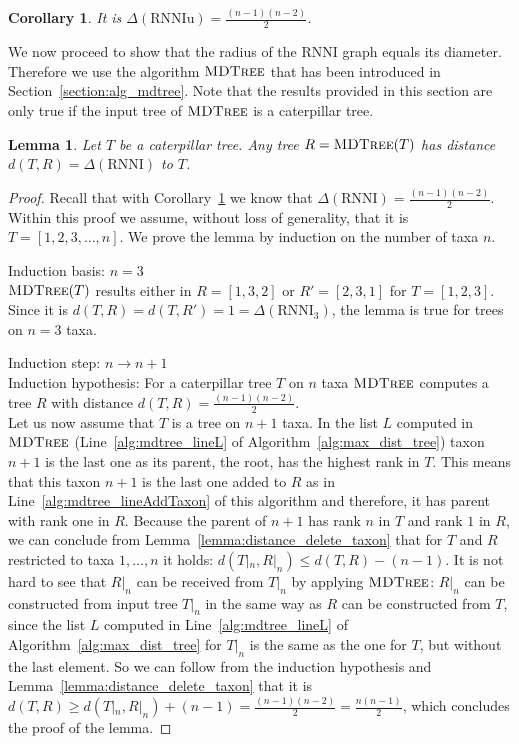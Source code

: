 \documentclass{amsart}
\newcommand{\rnni}{\mathrm{RNNI}}
\newcommand{\rnniu}{\mathrm{RNNIu}}
\newcommand{\mdtree}{\textsc{MDTree}}
\newtheorem{lemma}[definition]{Lemma}
\newtheorem{corollary}[definition]{Corollary}
\begin{document}
\begin{corollary}
It is $\Delta(\rnniu) = \frac{(n-1)(n-2)}{2}$.
\label{corollary:diameter}
\end{corollary}

We now proceed to show that the radius of the $\rnni$ graph equals its diameter.
Therefore we use the algorithm $\mdtree$ that has been introduced in Section~\ref{section:alg_mdtree}.
Note that the results provided in this section are only true if the input tree of $\mdtree$ is a caterpillar tree.

\begin{lemma}
Let $T$ be a caterpillar tree.
Any tree $R = \mdtree(T)$ has distance $d(T,R) = \Delta(\rnni)$ to $T$.
\label{lemma:max_dist_caterpillar}
\end{lemma}

\begin{proof}
Recall that with Corollary~\ref{corollary:diameter} we know that $\Delta(\rnni) = \frac{(n-1)(n-2)}{2}$.
Within this proof we assume, without loss of generality, that it is $T = [1,2,3,\ldots,n]$.
We prove the lemma by induction on the number of taxa $n$.

Induction basis: $n = 3$\\
$\mdtree(T)$ results either in $R =[1,3,2]$ or $R'= [2,3,1]$ for $T = [1,2,3]$.
Since it is $d(T,R) = d(T,R') = 1 = \Delta(\rnni_3)$, the lemma is true for trees on $n=3$ taxa.

Induction step: $n \to n+1$\\
Induction hypothesis: For a caterpillar tree $T$ on $n$ taxa $\mdtree$ computes a tree $R$ with distance $d(T,R) = \frac{(n-1)(n-2)}{2}$.\\
Let us now assume that $T$ is a tree on $n+1$ taxa.
In the list $L$ computed in $\mdtree$ (Line~\ref{alg:mdtree_lineL} of Algorithm~\ref{alg:max_dist_tree}) taxon $n+1 $ is the last one as its parent, the root, has the highest rank in $T$.
This means that this taxon $n+1$ is the last one added to $R$ as in Line~\ref{alg:mdtree_lineAddTaxon} of this algorithm and therefore, it has parent with rank one in $R$.
Because the parent of $n+1$ has rank $n$ in $T$ and rank $1$ in $R$, we can conclude from Lemma~\ref{lemma:distance_delete_taxon} that for $T$ and $R$ restricted to taxa $1,\ldots,n$ it holds: $d(T|_n,R|_n) \leq d(T,R) - (n-1)$.
It is not hard to see that $R|_n$ can be received from $T|_n$ by applying $\mdtree$:
$R|_n$ can be constructed from input tree $T|_n$ in the same way as $R$ can be constructed from $T$, since the list $L$ computed in Line~\ref{alg:mdtree_lineL} of Algorithm~\ref{alg:max_dist_tree} for $T|_n$ is the same as the one for $T$, but without the last element.
So we can follow from the induction hypothesis and Lemma~\ref{lemma:distance_delete_taxon} that it is $d(T,R) \geq d(T|_n,R|_n) + (n-1) = \frac{(n-1)(n-2)}{2} = \frac{n(n-1)}{2}$, which concludes the proof of the lemma.
\end{proof}
\end{document}
